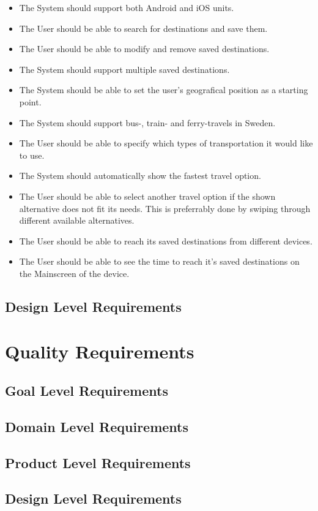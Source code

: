 \documentclass[a4paper]{article}
\begin{document}
				\begin{itemize}
					\item The System should support both Android and iOS units.
					\item The User should be able to search for destinations and save them.
					\item The User should be able to modify and remove saved destinations.
					\item The System should support multiple saved destinations.
					\item The System should be able to set the user's geografical position as a starting point.
					\item The System should support bus-, train- and ferry-travels in Sweden.
					\item The User should be able to specify which types of transportation it would like to use. 
					\item The System should automatically show the fastest travel option.
					\item The User should be able to select another travel option if the shown alternative does not fit its needs. This 				is preferrably done by swiping through different available alternatives.
					\item The User should be able to reach its saved destinations from different devices.
					\item The User should be able to see the time to reach it's saved destinations on the Mainscreen of the device.
				\end{itemize}
	\subsection{Design Level Requirements}
	\section{Quality Requirements}
		\subsection{Goal Level Requirements}
		\subsection{Domain Level Requirements}
		\subsection{Product Level Requirements}
					
		\subsection{Design Level Requirements}	
	
\end{document}
